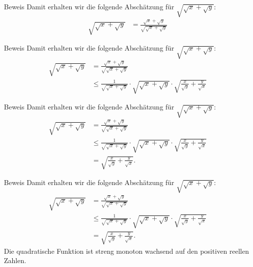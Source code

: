 \documentclass[10pt]{beamer}
\begin{document}
\begin{frame}{Beweis}
    Damit erhalten wir die folgende Abschätzung für \( \sqrt{\sqrt{x} + \sqrt{y}} \):
    \begin{align*}
        \sqrt{\sqrt{x} + \sqrt{y}}
        & = \frac{\sqrt{x} + \sqrt{y}}{\sqrt{\sqrt{x} + \sqrt{y}}}
    \end{align*}
\end{frame}



\begin{frame}{Beweis}
    Damit erhalten wir die folgende Abschätzung für \( \sqrt{\sqrt{x} + \sqrt{y}} \):
    \begin{align*}
        \sqrt{\sqrt{x} + \sqrt{y}}
        & = \frac{\sqrt{x} + \sqrt{y}}{\sqrt{\sqrt{x} + \sqrt{y}}} \\
        & \leq \frac{1}{\sqrt{\sqrt{x} + \sqrt{y}}} \cdot \sqrt{\sqrt{x} + \sqrt{y}} \cdot \sqrt{\frac{x}{\sqrt{y}} + \frac{y}{\sqrt{x}}}
    \end{align*}
\end{frame}



\begin{frame}{Beweis}
    Damit erhalten wir die folgende Abschätzung für \( \sqrt{\sqrt{x} + \sqrt{y}} \):
    \begin{align*}
        \sqrt{\sqrt{x} + \sqrt{y}}
        & = \frac{\sqrt{x} + \sqrt{y}}{\sqrt{\sqrt{x} + \sqrt{y}}} \\
        & \leq \frac{1}{\sqrt{\sqrt{x} + \sqrt{y}}} \cdot \sqrt{\sqrt{x} + \sqrt{y}} \cdot \sqrt{\frac{x}{\sqrt{y}} + \frac{y}{\sqrt{x}}} \\
        & = \sqrt{\frac{x}{\sqrt{y}} + \frac{y}{\sqrt{x}}}.
    \end{align*}
\end{frame}



\begin{frame}{Beweis}
    Damit erhalten wir die folgende Abschätzung für \( \sqrt{\sqrt{x} + \sqrt{y}} \):
    \begin{align*}
        \sqrt{\sqrt{x} + \sqrt{y}}
        & = \frac{\sqrt{x} + \sqrt{y}}{\sqrt{\sqrt{x} + \sqrt{y}}} \\
        & \leq \frac{1}{\sqrt{\sqrt{x} + \sqrt{y}}} \cdot \sqrt{\sqrt{x} + \sqrt{y}} \cdot \sqrt{\frac{x}{\sqrt{y}} + \frac{y}{\sqrt{x}}} \\
        & = \sqrt{\frac{x}{\sqrt{y}} + \frac{y}{\sqrt{x}}}.
    \end{align*}
    Die quadratische Funktion ist streng monoton wachsend auf den positiven reellen Zahlen.
\end{frame}
\end{document}
